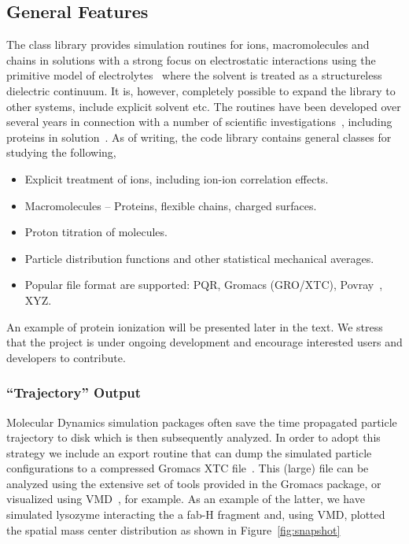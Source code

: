 \documentclass[10pt]{bmc_article}
\newenvironment{bmcformat}{\fussy\setboolean{publ}{true}}{\fussy}
\begin{document}
\begin{bmcformat}
\subsection*{General Features}
The class library provides simulation routines for ions, macromolecules and chains in solutions with a strong focus on electrostatic interactions using the primitive model of electrolytes~\cite{hill:86} where the solvent is treated as a structureless dielectric continuum. It is, however, completely possible to expand the library to other systems, include explicit solvent etc. The routines have been developed over several years in connection with a number of scientific investigations~\cite{lund-thesis}, including proteins in solution~\cite{lund:05}.
As of writing, the code library contains general classes for studying the following,
\begin{itemize}
\item Explicit treatment of ions, including ion-ion correlation effects.
\item Macromolecules -- Proteins, flexible chains, charged surfaces.
\item Proton titration of molecules.
\item Particle distribution functions and other statistical mechanical averages.
\item Popular file format are supported: PQR, Gromacs (GRO/XTC), Povray~\cite{povray}, XYZ.
\end{itemize}
An example of protein ionization will be presented later in the text.
We stress that the project is under ongoing development and encourage interested users and developers to contribute.

\subsubsection*{``Trajectory'' Output}
Molecular Dynamics simulation packages often save the time propagated particle trajectory to disk which is then subsequently analyzed.
In order to adopt this strategy we include an export routine that can dump the simulated particle configurations to a compressed Gromacs XTC file~\cite{gromacs}.
This (large) file can be analyzed using the extensive set of tools provided in the Gromacs package, or visualized using VMD~\cite{vmd}, for example.
As an example of the latter, we have simulated lysozyme interacting the a fab-H fragment and, using VMD, plotted the spatial mass center distribution as shown in Figure~\ref{fig:snapshot}




\end{bmcformat}
\end{document}
